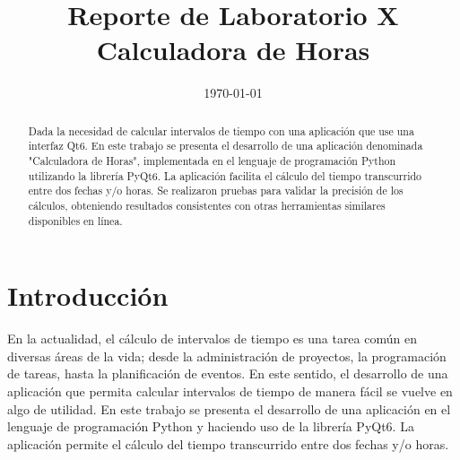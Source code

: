\documentclass[conference]{IEEEtran}
\date{\specialdate\today}
\begin{document}
\newcommand{\breite}{0.9} %
\newcommand{\RelacionFiguradoscolumnas}{0.9}
\newcommand{\RelacionFiguradoscolumnasPuntoCinco}{0.45}

\title{Reporte de Laboratorio X \\ Calculadora de Horas}

\author{
}

\maketitle

\begin{abstract} 
    Dada la necesidad de calcular intervalos de tiempo con una aplicación que use una interfaz Qt6. En este trabajo se presenta el desarrollo de una aplicación denominada "Calculadora de Horas", implementada en el lenguaje de programación Python utilizando la librería PyQt6. La aplicación facilita el cálculo del tiempo transcurrido entre dos fechas y/o horas. Se realizaron pruebas para validar la precisión de los cálculos, obteniendo resultados consistentes con otras herramientas similares disponibles en línea\cite{calculator}.
\end{abstract}

\section{Introducción}
    En la actualidad, el cálculo de intervalos de tiempo es una tarea común en diversas áreas de la vida; desde la administración de proyectos, la programación de tareas, hasta la planificación de eventos. En este sentido, el desarrollo de una aplicación que permita calcular intervalos de tiempo de manera fácil se vuelve en algo de utilidad. En este trabajo se presenta el desarrollo de una aplicación en el lenguaje de programación Python y haciendo uso de la librería PyQt6. La aplicación permite el cálculo del tiempo transcurrido entre dos fechas y/o horas.
\end{document}

